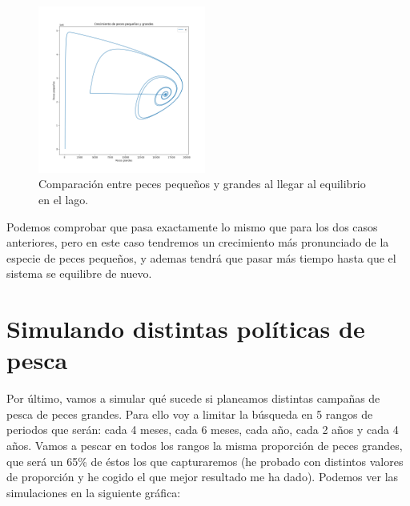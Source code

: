 \documentclass[11pt,a4paper]{report}
\begin{document}
\begin{figure}[H]
	\begin{center}
		\includegraphics[width=0.49\textwidth]{img/Cap-3/apartado-2/pequenyos_grandes_pesca_75.png}
		\caption{Comparación entre peces pequeños y grandes al llegar al equilibrio en el lago.}
		\label{fig:f3}
	\end{center}
\end{figure}

Podemos comprobar que pasa exactamente lo mismo que para los dos casos anteriores, pero en este caso tendremos un crecimiento más pronunciado de la especie de peces pequeños, y ademas tendrá que pasar más tiempo hasta que el sistema se equilibre de nuevo.

\section{Simulando distintas políticas de pesca}
Por último, vamos a simular qué sucede si planeamos distintas campañas de pesca de peces grandes. Para ello voy a limitar la búsqueda en 5 rangos de periodos que serán: cada 4 meses, cada 6 meses, cada año, cada 2 años y cada 4 años. Vamos a pescar en todos los rangos la misma proporción de peces grandes, que será un 65\% de éstos los que capturaremos (he probado con distintos valores de proporción y he cogido el que mejor resultado me ha dado). Podemos ver las simulaciones en la siguiente gráfica:
\end{document}
